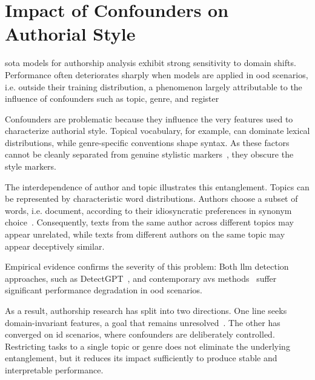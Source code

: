 \section{Impact of Confounders on Authorial Style}
\label{sec:contextual_factors}

\Acl{sota} models for authorship analysis exhibit strong sensitivity to domain shifts. 
Performance often deteriorates sharply when models are applied in \ac{ood} scenarios, i.e. outside their training distribution, a phenomenon largely attributable to the influence of confounders such as topic, genre, and register~\citep{Sundararajan_style_18,bischoff_importance_2020}

Confounders are problematic because they influence the very features used to characterize authorial style. 
Topical vocabulary, for example, can dominate lexical distributions, while genre-specific conventions shape syntax. 
As these factors cannot be cleanly separated from genuine stylistic markers~\citep{bischoff_importance_2020}, they obscure the style markers.

The interdependence of author and topic illustrates this entanglement. 
Topics can be represented by characteristic word distributions.
Authors choose a subset of words, i.e. document, according to their idiosyncratic preferences in synonym choice~\citep{altakrori_topic_2021}. 
Consequently, texts from the same author across different topics may appear unrelated, while texts from different authors on the same topic may appear deceptively similar.

Empirical evidence confirms the severity of this problem:
Both \ac{llm} detection approaches, such as DetectGPT~\citep{mitchell_detectgpt_2023,Wu_ODD_challenges_2025}, and contemporary \acp{av} methods~\citep{Thomas_cross_topic_24} suffer significant performance degradation in \ac{ood} scenarios.

As a result, authorship research has split into two directions. 
One line seeks domain-invariant features, a goal that remains unresolved~\citep{bischoff_importance_2020}. 
The other has converged on \ac{id} scenarios, where confounders are deliberately controlled. 
Restricting tasks to a single topic or genre does not eliminate the underlying entanglement, but it reduces its impact sufficiently to produce stable and interpretable performance.


